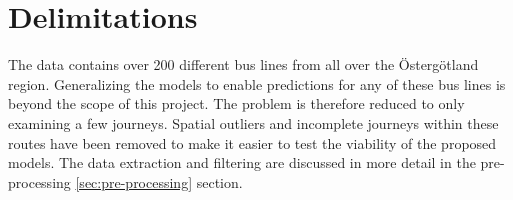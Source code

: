 \section{Delimitations}
\label{sec:delimitations}

The data contains over 200 different bus lines from all over the Östergötland region. Generalizing the models to enable predictions for any of these bus lines is beyond the scope of this project. The problem is therefore reduced to only examining a few journeys. Spatial outliers and incomplete journeys within these routes have been removed to make it easier to test the viability of the proposed models. The data extraction and filtering are discussed in more detail in the pre-processing \ref{sec:pre-processing} section.




